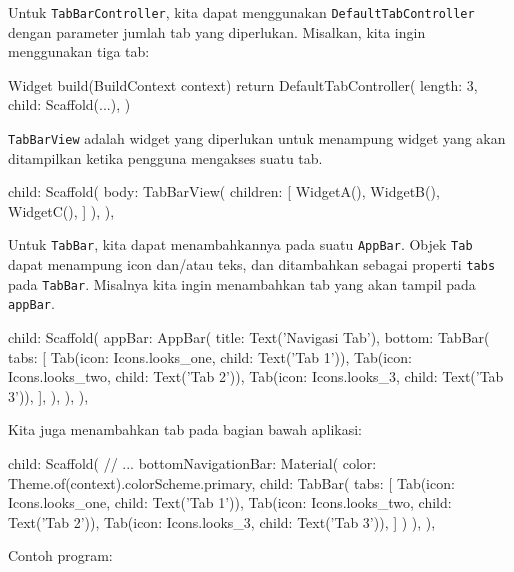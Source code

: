 \documentclass[a4paper,11pt]{article} %
\newcommand{\txtinline}[1]{\texttt{#1}}
\begin{document}
Untuk \txtinline{TabBarController}, kita dapat menggunakan \txtinline{DefaultTabController}
dengan parameter jumlah tab yang diperlukan. Misalkan, kita ingin menggunakan tiga
tab:
\begin{dartcode}
Widget build(BuildContext context) {
  return DefaultTabController(
    length: 3,
    child: Scaffold(...),
  )
}
\end{dartcode}

\txtinline{TabBarView} adalah widget yang diperlukan untuk menampung widget yang
akan ditampilkan ketika pengguna mengakses suatu tab.
\begin{dartcode}
child: Scaffold(
  body: TabBarView(
    children: [
      WidgetA(),
      WidgetB(),
      WidgetC(),
    ]
  ),
),
\end{dartcode}

Untuk \txtinline{TabBar}, kita dapat menambahkannya pada suatu \txtinline{AppBar}.
Objek \txtinline{Tab} dapat menampung icon dan/atau teks, dan ditambahkan sebagai
properti \txtinline{tabs} pada \txtinline{TabBar}.
Misalnya kita ingin menambahkan tab yang akan tampil pada \txtinline{appBar}.
\begin{dartcode}
child: Scaffold(
  appBar: AppBar(
    title: Text('Navigasi Tab'),
    bottom: TabBar(
      tabs: [
        Tab(icon: Icons.looks_one, child: Text('Tab 1')),
        Tab(icon: Icons.looks_two, child: Text('Tab 2')),
        Tab(icon: Icons.looks_3, child: Text('Tab 3')),
      ],
    ),
  ),
),
\end{dartcode}

Kita juga menambahkan tab pada bagian bawah aplikasi:
\begin{dartcode}
child: Scaffold(
  // ...
  bottomNavigationBar: Material(
    color: Theme.of(context).colorScheme.primary,
    child: TabBar(
      tabs: [
        Tab(icon: Icons.looks_one, child: Text('Tab 1')),
        Tab(icon: Icons.looks_two, child: Text('Tab 2')),
        Tab(icon: Icons.looks_3, child: Text('Tab 3')),
      ]
    )
  ),
),
\end{dartcode}

Contoh program:
\end{document}
